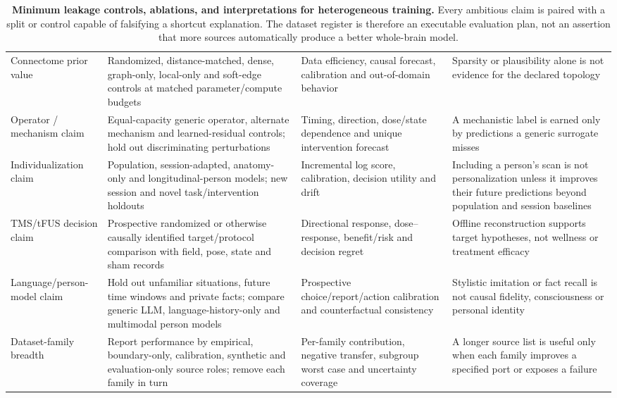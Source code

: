 \begin{table}[!h]
\begin{tabularx}{\textwidth}{@{}p{}p{}p{}X@{}}
Connectome prior value &
Randomized, distance-matched, dense, graph-only, local-only and soft-edge
controls at matched parameter/compute budgets &
Data efficiency, causal forecast, calibration and out-of-domain behavior &
Sparsity or plausibility alone is not evidence for the declared topology\\

Operator / mechanism claim &
Equal-capacity generic operator, alternate mechanism and learned-residual
controls; hold out discriminating perturbations &
Timing, direction, dose/state dependence and unique intervention forecast &
A mechanistic label is earned only by predictions a generic surrogate misses\\

Individualization claim &
Population, session-adapted, anatomy-only and longitudinal-person models; new
session and novel task/intervention holdouts &
Incremental log score, calibration, decision utility and drift &
Including a person's scan is not personalization unless it improves their
future predictions beyond population and session baselines\\

TMS/tFUS decision claim &
Prospective randomized or otherwise causally identified target/protocol
comparison with field, pose, state and sham records &
Directional response, dose--response, benefit/risk and decision regret &
Offline reconstruction supports target hypotheses, not wellness or treatment
efficacy\\

Language/person-model claim &
Hold out unfamiliar situations, future time windows and private facts;
compare generic LLM, language-history-only and multimodal person models &
Prospective choice/report/action calibration and counterfactual consistency &
Stylistic imitation or fact recall is not causal fidelity, consciousness or
personal identity\\

Dataset-family breadth &
Report performance by empirical, boundary-only, calibration, synthetic and
evaluation-only source roles; remove each family in turn &
Per-family contribution, negative transfer, subgroup worst case and
uncertainty coverage &
A longer source list is useful only when each family improves a specified
port or exposes a failure\\
\bottomrule
\end{tabularx}
\caption{\textbf{Minimum leakage controls, ablations, and interpretations for
heterogeneous training.} Every ambitious claim is paired with a split or
control capable of falsifying a shortcut explanation. The dataset register is
therefore an executable evaluation plan, not an assertion that more sources
automatically produce a better whole-brain model.}
\label{tab:mixture-evaluation}
\end{table}

